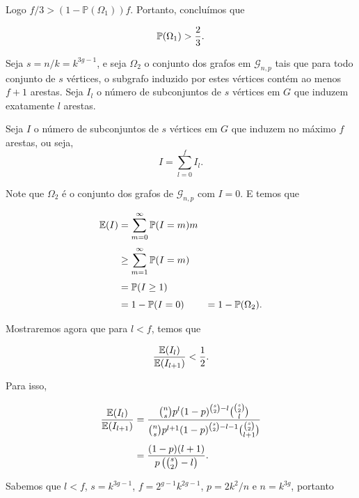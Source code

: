 Logo $f/3 > (1-\mathbb{P}(\Omega_1))f$. Portanto, concluímos que

\begin{equation}\label{teoerdosomega1}
\mathbb{P}(\Omega_1) > \frac{2}{3}.  
\end{equation}

Seja $s = n/k = k^{3g-1}$, e seja $\Omega_2$ o conjunto dos grafos em $\mathcal{G}_{n,p}$ tais que para todo conjunto de $s$ vértices, o subgrafo induzido por estes vértices contém ao menos $f+1$ arestas. Seja $I_l$ o número de subconjuntos de $s$ vértices em $G$ que induzem exatamente $l$ arestas.

Seja $I$ o número de subconjuntos de $s$ vértices em $G$ que induzem no máximo $f$ arestas, ou seja, \[I = \sum\limits_{l=0}^{f}I_l.\]

Note que $\Omega_2$ é o conjunto dos grafos de $\mathcal{G}_{n,p}$ com $I = 0$. E temos que

\begin{equation*}
\setlength{\jot}{6pt}
\begin{aligned}
\bbe(I) &= \sum\limits_{m=0}^{\infty}\bbp(I = m)m \\
&\geq \sum\limits_{m=1}^{\infty}\bbp(I = m) \\
&= \bbp(I \geq 1) \\
&= 1 - \bbp(I = 0) &= 1 - \bbp(\Omega_2).
\end{aligned}
\end{equation*}

Mostraremos agora que para $l < f$, temos que

\[\frac{\mathbb{E}(I_l)}{\mathbb{E}(I_{l+1})} < \frac{1}{2}.\]

Para isso, 

\begin{equation*}
\setlength{\jot}{6pt}
\begin{aligned}
\frac{\bbe(I_l)}{\bbe(I_{l+1})} &= \frac{\binom{n}{s}p^l (1-p)^{\binom{s}{2}-l} \binom{\binom{s}{2}}{l}}{\binom{n}{s}p^{l+1} (1-p)^{\binom{s}{2}-l-1} \binom{\binom{s}{2}}{l+1}} \\
&= \frac{(1-p)(l+1)}{p\left(\binom{s}{2}-l\right)}.
\end{aligned}
\end{equation*}

Sabemos que $l < f$, $s = k^{3g-1}$, $f = 2^{g-1}k^{2g-1}$, $p = 2k^2/n$ e $n = k^{3g}$, portanto

